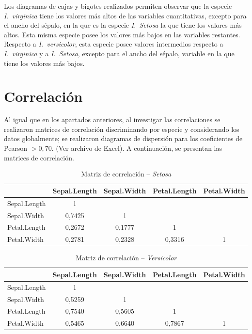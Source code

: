 \documentclass[12pt,a4paper]{article}
\begin{document}
Los diagramas de cajas y bigotes realizados permiten observar que la especie \textit{I.~virginica} tiene los valores más altos de las variables cuantitativas, excepto para el ancho del sépalo, en la que es la especie \textit{I.~Setosa} la que tiene los valores más altos. Esta misma especie posee los valores más bajos en las variables restantes. Respecto a \textit{I.~versicolor}, esta especie posee valores intermedios respecto a \textit{I.~virginica} y a \textit{I.~Setosa}, excepto para el ancho del sépalo, variable en la que tiene los valores más bajos.

\section{Correlación}

Al igual que en los apartados anteriores, al investigar las correlaciones se realizaron matrices de correlación discriminando por especie y considerando los datos globalmente; se realizaron diagramas de dispersión para los coeficientes de Pearson $> 0{,}70$. (Ver archivo de Excel). A continuación, se presentan las matrices de correlación.

\begin{table}[h!]
\centering
\caption{Matriz de correlación -- \textit{Setosa}}
\label{fig:corr_setosa}
\begin{tabular}{lcccc}
\toprule
 & \textbf{Sepal.Length} & \textbf{Sepal.Width} & \textbf{Petal.Length} & \textbf{Petal.Width} \\
\midrule
Sepal.Length & 1          &            &            &   \\
Sepal.Width  & 0,7425     & 1          &            &   \\
Petal.Length & 0,2672     & 0,1777     & 1          &   \\
Petal.Width  & 0,2781     & 0,2328     & 0,3316     & 1 \\
\bottomrule
\end{tabular}
\end{table}

\begin{table}[h!]
\centering
\caption{Matriz de correlación -- \textit{Versicolor}}
\label{fig:corr_versicolor}
\begin{tabular}{lcccc}
\toprule
 & \textbf{Sepal.Length} & \textbf{Sepal.Width} & \textbf{Petal.Length} & \textbf{Petal.Width} \\
\midrule
Sepal.Length & 1          &            &            &   \\
Sepal.Width  & 0,5259     & 1          &            &   \\
Petal.Length & 0,7540     & 0,5605     & 1          &   \\
Petal.Width  & 0,5465     & 0,6640     & 0,7867     & 1 \\
\bottomrule
\end{tabular}
\end{table}
\end{document}

